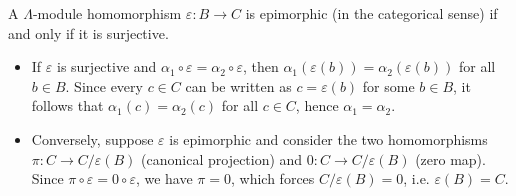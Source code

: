 A $\Lambda$-module homomorphism $\varepsilon : B \rightarrow C$ is epimorphic (in the categorical sense) if and only if it is surjective.

\begin{itemize}
\item If $\varepsilon$ is surjective and $\alpha_1 \circ \varepsilon = \alpha_2 \circ \varepsilon$, then $\alpha_1(\varepsilon(b)) = \alpha_2(\varepsilon(b))$ for all $b \in B$. Since every $c \in C$ can be written as $c = \varepsilon(b)$ for some $b \in B$, it follows that $\alpha_1(c) = \alpha_2(c)$ for all $c \in C$, hence $\alpha_1 = \alpha_2$.

\item Conversely, suppose $\varepsilon$ is epimorphic and consider the two homomorphisms $\pi : C \rightarrow C / \varepsilon(B)$ (canonical projection) and $0 : C \rightarrow C / \varepsilon(B)$ (zero map). Since $\pi \circ \varepsilon = 0 \circ \varepsilon$, we have $\pi = 0$, which forces $C / \varepsilon(B) = 0$, i.e. $\varepsilon(B) = C$.
\end{itemize}
